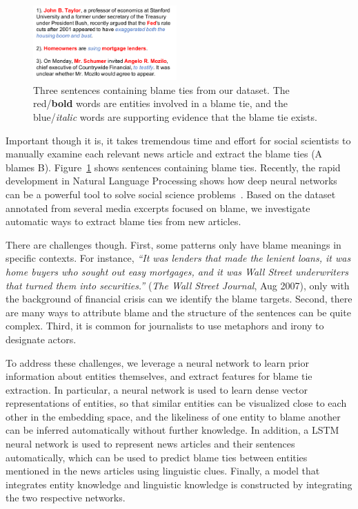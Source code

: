 \documentclass[letterpaper]{article}
\begin{document}
\begin{figure}[t!]
\centering
\includegraphics[width=0.49\textwidth]{demo}
\caption{Three sentences containing blame ties from our dataset. The red/{\bf bold} words are entities involved in a blame tie, and the blue/{\it italic} words are supporting evidence that the blame tie exists.}
\label{figure:introdemo}
\end{figure}

Important though it is, it takes tremendous time and effort for social scientists to manually examine each relevant news article and extract the blame ties (A blames B). Figure~\ref{figure:introdemo} shows sentences containing blame ties. Recently, the rapid development in Natural Language Processing shows how deep neural networks can be a powerful tool to solve social science problems~\cite{rule2015lexical,bail2016combining}. Based on the dataset annotated from several media excerpts focused on blame, we investigate automatic ways to extract blame ties from new articles.

There are challenges though. First, some patterns only have blame meanings in specific contexts. For instance, {\it ``It was lenders that made the lenient loans, it was home buyers who sought out easy mortgages, and it was Wall Street underwriters that turned them into securities.''} ({\it The Wall Street Journal}, Aug 2007), only with the background of financial crisis can we identify the blame targets. Second, there are many ways to attribute blame and the structure of the sentences can be quite complex. Third, it is common for journalists to use metaphors and irony to designate actors.

To address these challenges, we leverage a neural network to learn prior information about entities themselves, and extract features for blame tie extraction. In particular, a neural network is used to learn dense vector representations of entities, so that similar entities can be visualized close to each other in the embedding space, and the likeliness of one entity to blame another can be inferred automatically without further knowledge. In addition, a LSTM neural network is used to represent news articles and their sentences automatically, which can be used to predict blame ties between entities mentioned in the news articles using linguistic clues. Finally, a model that integrates entity knowledge and linguistic knowledge is constructed by integrating the two respective networks. 
\end{document}
